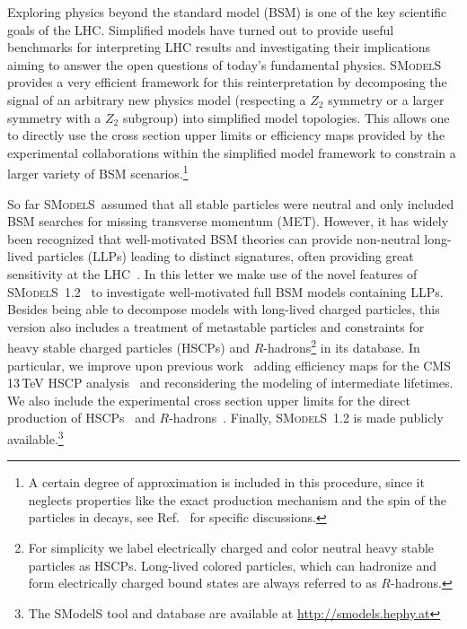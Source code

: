 \documentclass[preprint,number,sort&compress,twocolumn,3p]{elsstyarticle}
\newcommand{\smo}{\textsc{SModelS}}
\newcommand{\com}[1]{\emph{\color{red}[#1]}}  %
\begin{document}
Exploring physics beyond the standard model (BSM) is one of the key scientific goals of 
the LHC\@.
Simplified models have turned out to provide useful 
benchmarks for interpreting LHC results and investigating their implications
aiming to answer the open questions of today's fundamental physics. \smo~\cite{Kraml:2013mwa,Ambrogi:2017neo}
provides a very efficient framework for this
reinterpretation by decomposing the signal of an arbitrary new physics model (respecting a $Z_2$ 
symmetry or a larger symmetry with a $Z_2$ subgroup) into simplified model topologies.
This allows one to directly use the cross section upper limits or efficiency maps provided by the experimental 
collaborations within the simplified model framework to constrain a larger
variety of BSM scenarios.\footnote{A certain degree of approximation is included in this procedure, since it  neglects properties like the exact production mechanism and the spin of the  particles in decays, see Ref.~\cite{Edelhauser:2014ena,Edelhauser:2015ksa,Arina:2015uea,Kraml:2016eti} for specific discussions.}

So far \smo~assumed that all stable particles were neutral and only included BSM searches for missing transverse momentum (MET).
However, it has widely been recognized that well-motivated
BSM theories can provide non-neutral long-lived particles (LLPs) leading to distinct signatures,
often providing great sensitivity at the LHC~\cite{}.
In this letter we make use of the novel features of \smo~1.2~\cite{smodlesnote} to investigate well-motivated
full BSM models containing LLPs.
Besides being able to decompose models with long-lived 
charged particles, this version also includes a treatment of metastable particles and constraints for heavy stable
charged particles (HSCPs) and $R$-hadrons\footnote{For simplicity we label electrically charged and color neutral heavy stable particles as HSCPs. Long-lived colored particles, which can hadronize and form electrically charged bound states are always referred to as $R$-hadrons.} in its database.
In particular, we improve upon previous work~\cite{Heisig:2015yla} adding 
efficiency maps for the CMS 13\,TeV HSCP analysis~\cite{CMS-PAS-EXO-16-036} and reconsidering the modeling of intermediate lifetimes.
We also include the experimental 
cross section upper limits for the direct production of HSCPs~\cite{Khachatryan:2015lla,CMS-PAS-EXO-16-036} and $R$-hadrons~\cite{CMS-PAS-EXO-16-036}.
Finally, \smo~1.2 is made publicly available.\footnote{The SModelS tool and database are available at \href{http://smodels.hephy.at}{http://smodels.hephy.at}}
\end{document}
